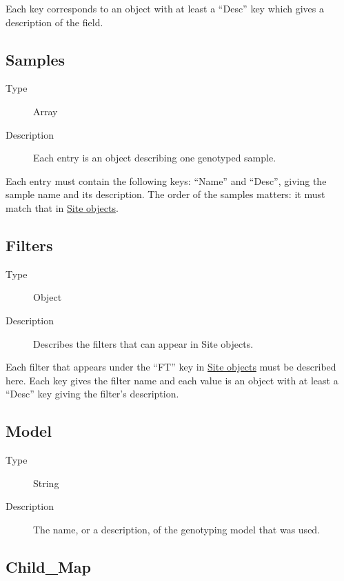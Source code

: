 Each key corresponds to an object with at least a ``Desc'' key which
gives a description of the field.

\hypertarget{samples}{%
\subsection{Samples}\label{samples}}

\begin{description}
\item[Type]
Array
\item[Description]
Each entry is an object describing one genotyped sample.
\end{description}

Each entry must contain the following keys: ``Name'' and ``Desc'',
giving the sample name and its description. The order of the samples
matters: it must match that in \protect\hyperlink{site_obj}{Site
objects}.

\hypertarget{filters}{%
\subsection{Filters}\label{filters}}

\begin{description}
\item[Type]
Object
\item[Description]
Describes the filters that can appear in Site objects.
\end{description}

Each filter that appears under the ``FT'' key in
\protect\hyperlink{site_obj}{Site objects} must be described here. Each
key gives the filter name and each value is an object with at least a
``Desc'' key giving the filter's description.

\hypertarget{model}{%
\subsection{Model}\label{model}}

\begin{description}
\item[Type]
String
\item[Description]
The name, or a description, of the genotyping model that was used.
\end{description}

\hypertarget{child_map}{%
\subsection{Child\_Map}\label{child_map}}


